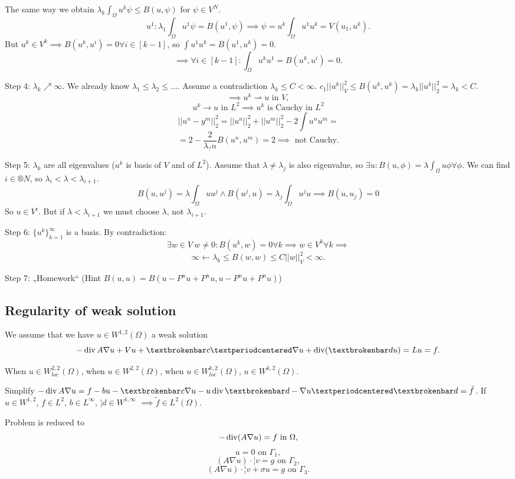 \documentclass[12pt]{article}					%
\begin{document}
\begin{veta}
\begin{dukazin}
		The same way we obtain $\lambda_k \int_\Omega u^k \psi ≤ B(u, \psi)$ for $\psi \in V^N$.
		$$ u^1 : \lambda_1 \int_\Omega u^1 \psi = B(u^1, \psi) \implies \psi = u^k \int_\Omega u^1 u^k = V(u_1, u^k). $$
		But $u^k \in V^k \implies B(u^k, u^i) = 0 \forall i \in [k-1]$, so $\int u^1 u^k = B(u^1, u^k) = 0$.
		$$ \implies \forall i \in [k-1]: \int_\Omega u^k u^1 = B(u^k, u^i) = 0. $$

		Step 4: $\lambda_k \nearrow ∞$. We already know $\lambda_1 ≤ \lambda_2 ≤ …$. Assume a contradiction $\lambda_k ≤ C < ∞$. $c_1 ||u^k||_V^2 ≤ B(u^k, u^k) = \lambda_k ||u^k||_2^2 = \lambda_k < C$.
		$$ \implies u^k \rightharpoonup u \text{ in } V, $$
		$$ u^k \rightarrow u \text{ in } L^2 \implies u^k \text{ is Cauchy in } L^2 $$
		$$ ||u^n - y^m||_2^2 = ||u^n||_2^2 + ||u^m||_2^2 - 2 \int u^n u^m = $$
		$$ = 2 - \frac{2}{\lambda_? n} B(u^n, u^m) = 2 \implies \text{ not Cauchy}. $$

		Step 5: $\lambda_k$ are all eigenvalues ($u^k$ is basis of $V$ and of $L^2$). Assume that $\lambda ≠ \lambda_j$ is also eigenvalue, so $\exists u: B(u, \phi) = \lambda \int_\Omega u \phi \forall \phi$. We can find $i \in ®N$, so $\lambda_i < \lambda < \lambda_{i+1}$.
		$$ B(u, u^j) = \lambda \int_\Omega u u^j \land B(u^j, u) = \lambda_j \int_\Omega u^j u \implies B(u, u_j) = 0 $$
		So $u \in V^i$. But if $\lambda < \lambda_{i + 1}$ we must choose $\lambda$, not $\lambda_{i + 1}$. \lightning

		Step 6: $\{u^k\}_{k=1}^∞$ is a basis. By contradiction:
		$$ \exists w \in V\ w ≠ 0: B(u^k, w) = 0 \forall k \implies w \in V^k \forall k \implies $$
		$$ ∞ \leftarrow \lambda_k ≤ B(w, w) ≤ C||w||_V^2 < ∞. $$

		Step 7: „Homework“ (Hint $B(u, u) = B(u - P^n u + P^n u, u - P^n u + P^n u)$)
	\end{dukazin}
\end{veta}


\subsection{Regularity of weak solution}
\begin{poznamka}
	We assume that we have $u \in W^{1, 2}(\Omega)$ a weak solution
	$$ - \Div A \nabla u + Vu + ¦c·\nabla u + \Div(¦du) = Lu = f. $$

	When $u \in W_{loc}^{2, 2}(\Omega)$, when $u \in W^{2,2}(\Omega)$, when $u \in W^{k, 2}_{loc}(\Omega)$, $u \in W^{k, 2}(\Omega)$.

	Simplify $- \Div A \nabla u = f - bu - ¦c \nabla u - u \Div ¦d - \nabla u · ¦d = \tilde f$. If $u \in W^{1, 2}$, $f \in L^2$, $b \in L^∞$, $¦d \in W^{1, ∞}$ $\implies \tilde f \in L^2(\Omega)$.

	Problem is reduced to
	$$ - \operatorname{div}(A \nabla u) = f \text{ in } \Omega, $$
	$$ u = 0 \text{ on } \Gamma_1, $$
	$$ (A \nabla u)·¦v = g \text{ on } \Gamma_2, $$
	$$ (A \nabla u)·¦v + \sigma u = g \text{ on } \Gamma_3. $$
\end{poznamka}
\end{document}
